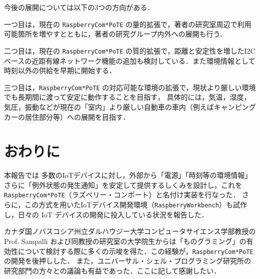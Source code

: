 今後の展開については以下の3つの方向がある．

一つ目は，現在の {\tt Raspberry\-Com*PoTE} の量的拡張で，著者の研究室周辺で利用可能箇所を増やすとともに，著者の研究グループ内外への展開も行う．


二つ目は，現在の {\tt Raspberry\-Com*PoTE} の質的拡張で，距離と安定性を増したI2Cベースの近距有線ネットワーク機能の追加も検討している．また環境情報として時刻以外の供給を早期に開始する．


三つ目は，{\tt Raspberry\-Com*PoTE} の対応可能な環境の拡張で，現状より厳しい環境でも長期間に渡って安定に動作することを目指す，
具体的には，気温，湿度，気圧，振動などが現在の「室内」より厳しい自動車の車内（例えばキャンピングカーの居住部分等）への展開を目指す．




\section{おわりに}
\label{sec:07conclusion}

本報告では
多数のIoTデバイスに対し，外部から「電源」「時刻等の環境情報」さらに「例外状態の発生通知」を安定して提供するしくみを設計し，これを {\tt Raspberry\-Com*PoTE}（ラズベリー・コンポート）と名付け実装を行なった．
さらに，この方式を用いたIoTデバイス開発環境（{\tt Raspberry\-Workbench}）も試作し，日々の IoT デバイスの開発に投入している状況を報告した．





\begin{acknowledgment}

カナダ国ノバスコシア州立ダルハウジー大学コンピュータサイエンス学部教授の Prof. Sampalli および同教授の研究室の大学院生からは「ものグラミング」の有効性について検討する際に多くの示唆を得た．この経験が，{\tt Raspberry\-Com*PoTE}の開発を後押しした．
また，ユニバーサル・シェル・プログラミング研究所の研究部門の方々との議論も有益であった．ここに記して感謝したい．

\end{acknowledgment}


